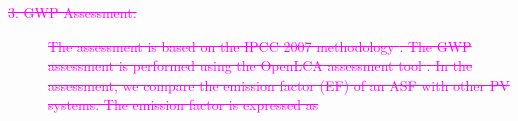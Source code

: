 \begin{description}




\item[\textcolor{magenta}{\sout{ 3. GWP Assessment:}}] \textcolor{magenta}{\sout{ The assessment is based on the IPCC 2007 methodology \cite{solomon2007climate}. The GWP assessment is performed using the OpenLCA assessment tool \cite{ciroth2007ict}. In the assessment, we compare the emission factor (EF) of an ASF with other PV systems. The emission factor is expressed as }}


\end{description}
